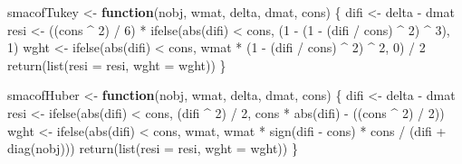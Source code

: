 \documentclass[
  12pt,
  letterpaper,
  DIV=11,
  numbers=noendperiod]{scrartcl}
\newenvironment{Shaded}{\begin{snugshade}}{\end{snugshade}}
\newcommand{\AttributeTok}[1]{\textcolor[rgb]{0.40,0.45,0.13}{#1}}
\newcommand{\ControlFlowTok}[1]{\textcolor[rgb]{0.00,0.23,0.31}{\textbf{#1}}}
\newcommand{\DecValTok}[1]{\textcolor[rgb]{0.68,0.00,0.00}{#1}}
\newcommand{\FunctionTok}[1]{\textcolor[rgb]{0.28,0.35,0.67}{#1}}
\newcommand{\NormalTok}[1]{\textcolor[rgb]{0.00,0.23,0.31}{#1}}
\newcommand{\OtherTok}[1]{\textcolor[rgb]{0.00,0.23,0.31}{#1}}
\newcommand{\SpecialCharTok}[1]{\textcolor[rgb]{0.37,0.37,0.37}{#1}}
\begin{document}
\begin{Shaded}
\begin{Highlighting}[]
\NormalTok{smacofTukey }\OtherTok{\textless{}{-}} \ControlFlowTok{function}\NormalTok{(nobj, wmat, delta, dmat, cons) \{}
\NormalTok{  difi }\OtherTok{\textless{}{-}}\NormalTok{ delta }\SpecialCharTok{{-}}\NormalTok{ dmat}
\NormalTok{  resi }\OtherTok{\textless{}{-}}\NormalTok{ ((cons }\SpecialCharTok{\^{}} \DecValTok{2}\NormalTok{) }\SpecialCharTok{/} \DecValTok{6}\NormalTok{) }\SpecialCharTok{*} \FunctionTok{ifelse}\NormalTok{(}\FunctionTok{abs}\NormalTok{(difi) }\SpecialCharTok{\textless{}}\NormalTok{ cons, (}\DecValTok{1} \SpecialCharTok{{-}}\NormalTok{ (}\DecValTok{1} \SpecialCharTok{{-}}\NormalTok{ (difi }\SpecialCharTok{/}\NormalTok{ cons) }\SpecialCharTok{\^{}} \DecValTok{2}\NormalTok{) }\SpecialCharTok{\^{}} \DecValTok{3}\NormalTok{), }\DecValTok{1}\NormalTok{)}
\NormalTok{  wght }\OtherTok{\textless{}{-}} \FunctionTok{ifelse}\NormalTok{(}\FunctionTok{abs}\NormalTok{(difi) }\SpecialCharTok{\textless{}}\NormalTok{ cons, wmat }\SpecialCharTok{*}\NormalTok{ (}\DecValTok{1} \SpecialCharTok{{-}}\NormalTok{ (difi }\SpecialCharTok{/}\NormalTok{ cons) }\SpecialCharTok{\^{}} \DecValTok{2}\NormalTok{) }\SpecialCharTok{\^{}} \DecValTok{2}\NormalTok{, }\DecValTok{0}\NormalTok{) }\SpecialCharTok{/} \DecValTok{2}
  \FunctionTok{return}\NormalTok{(}\FunctionTok{list}\NormalTok{(}\AttributeTok{resi =}\NormalTok{ resi, }\AttributeTok{wght =}\NormalTok{ wght))}
\NormalTok{\}}

\NormalTok{smacofHuber }\OtherTok{\textless{}{-}} \ControlFlowTok{function}\NormalTok{(nobj, wmat, delta, dmat, cons) \{}
\NormalTok{  difi }\OtherTok{\textless{}{-}}\NormalTok{ delta }\SpecialCharTok{{-}}\NormalTok{ dmat}
\NormalTok{  resi }\OtherTok{\textless{}{-}} \FunctionTok{ifelse}\NormalTok{(}\FunctionTok{abs}\NormalTok{(difi) }\SpecialCharTok{\textless{}}\NormalTok{ cons, (difi }\SpecialCharTok{\^{}} \DecValTok{2}\NormalTok{) }\SpecialCharTok{/} \DecValTok{2}\NormalTok{, cons }\SpecialCharTok{*} \FunctionTok{abs}\NormalTok{(difi) }\SpecialCharTok{{-}}\NormalTok{ ((cons }\SpecialCharTok{\^{}} \DecValTok{2}\NormalTok{) }\SpecialCharTok{/} \DecValTok{2}\NormalTok{))}
\NormalTok{  wght }\OtherTok{\textless{}{-}} \FunctionTok{ifelse}\NormalTok{(}\FunctionTok{abs}\NormalTok{(difi) }\SpecialCharTok{\textless{}}\NormalTok{ cons, wmat,}
\NormalTok{                 wmat }\SpecialCharTok{*} \FunctionTok{sign}\NormalTok{(difi }\SpecialCharTok{{-}}\NormalTok{ cons) }\SpecialCharTok{*}\NormalTok{ cons }\SpecialCharTok{/}\NormalTok{ (difi }\SpecialCharTok{+} \FunctionTok{diag}\NormalTok{(nobj)))}
  \FunctionTok{return}\NormalTok{(}\FunctionTok{list}\NormalTok{(}\AttributeTok{resi =}\NormalTok{ resi, }\AttributeTok{wght =}\NormalTok{ wght))}
\NormalTok{\}}
\end{Highlighting}
\end{Shaded}
\end{document}
